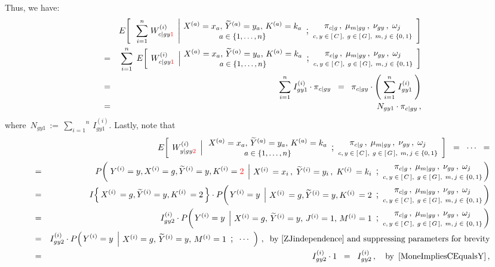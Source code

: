 \begin{enumerate}
	Thus, we have:
	\begin{eqnarray*}
	&&
		E\!\left[\;\;
			\left.
			\overset{n}{\underset{i=1}{\sum}} \; W^{(i)}_{c \vert gy{\color{red}1}}
			\,\;\right\vert
			\!\!
			\begin{array}{c} X^{(a)} = x_{a},\, \widetilde{Y}^{(a)} = y_{a},\, K^{(a)} = k_{a} \\ \textnormal{\small$a\in\{1,\ldots,n\}$} \end{array} \textnormal{\large;} \begin{array}{c} \pi_{c \vert g}\,, \; \mu_{m \vert gy}\,, \; \nu_{gy}\,, \; \omega_{j} \\ \textnormal{\scriptsize$c,y\in[\,C\,], \; g\in[\,G\,], \; m,j\in\{0,1\}$} \end{array}
		\right]
	\\
	&=&
		\overset{n}{\underset{i=1}{\sum}} \;\,
		E\!\left[\;
			\left.
			W^{(i)}_{c \vert gy{\color{red}1}}
			\,\;\right\vert
			\!\!
			\begin{array}{c} X^{(a)} = x_{a},\, \widetilde{Y}^{(a)} = y_{a},\, K^{(a)} = k_{a} \\ \textnormal{\small$a\in\{1,\ldots,n\}$} \end{array} \textnormal{\large;} \begin{array}{c} \pi_{c \vert g}\,, \; \mu_{m \vert gy}\,, \; \nu_{gy}\,, \; \omega_{j} \\ \textnormal{\scriptsize$c,y\in[\,C\,], \; g\in[\,G\,], \; m,j\in\{0,1\}$} \end{array}
		\right]
	\\
	&=&
		\overset{n}{\underset{i=1}{\sum}} \;
		I^{(i)}_{gy1} \cdot \pi_{c \vert gy}
	\;\; = \;\; 
		\pi_{c \vert gy}
		\cdot
		\left(\; \overset{n}{\underset{i=1}{\sum}} \; I^{(i)}_{gy1} \;\right)
	\\
	&=&
		N_{gy1} \cdot \pi_{c \vert gy}\,,
	\end{eqnarray*}
	where \,$N_{gy1} \,:=\, \overset{n}{\underset{i=1}{\sum}} \, I^{(i)}_{gy1}$.
	Lastly, note that
	\begin{eqnarray*}
	&&
		E\!\left[\;
			\left.
			W^{(i)}_{y \vert gy{\color{red}2}}
			\,\;\right\vert
			\EMConditionsWithValues
		\right]
		\;\; = \;\; \cdots \;\; =
	\\
	&=&
		P\!\left(\,
			\left.
			Y^{(i)} = y, X^{(i)} = g, \widetilde{Y}^{(i)} = y, K^{(i)} = {\color{red}2}
			\,\;\right\vert
			\!\!
			\ithEMConditionsWithValues
		\!\!\right)
	\\
	&=&
		I\!\left\{\,X^{(i)}\,=g , \widetilde{Y}^{(i)}=y , K^{(i)}\,=2\,\right\}
		\cdot
		P\!\left(
			\left.
			Y^{(i)} = y
			\,\;\right\vert
			\!\!
			\ithGYTwoEMConditionsWithValues
		\!\!\right)
	\\
	&=&
		I^{(i)}_{gy2}
		\cdot
		P\!\left(
			\left.
			Y^{(i)} = y
			\,\;\right\vert
			\!\!
			\begin{array}{c}
				X^{(i)} = g,\, \widetilde{Y}^{(i)} = y,\, J^{(i)} = 1,\, M^{(i)} = 1
			\end{array}
			\textnormal{\large;}
			\modelParameters
		\!\!\right)
	\\
	&=&
		I^{(i)}_{gy2}
		\cdot
		P\!\left(
			\left.
			Y^{(i)} = y
			\,\;\right\vert
			\!\!
			\begin{array}{c}
				X^{(i)} = g,\, \widetilde{Y}^{(i)} = y,\, M^{(i)} = 1
			\end{array}
			\textnormal{\large;}
			\;\;\cdots\;\;
		\right)\,,
		\;\;
		\textnormal{by \eqref{ZJindependence} and suppressing parameters for brevity}
	\\
	&=&
		I^{(i)}_{gy2} \cdot 1
		\;\; = \;\;
		I^{(i)}_{gy2}\,,
		\quad
		\textnormal{by \,\eqref{MoneImpliesCEqualsY}}\,,

\end{eqnarray*}
\end{enumerate}
